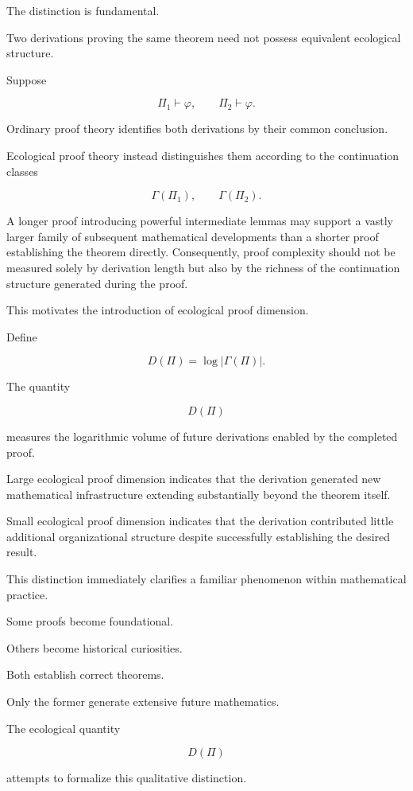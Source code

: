 \documentclass[12pt,oneside]{article}
\theoremstyle{remark}
\begin{document}
The distinction is fundamental.

Two derivations proving the same theorem need not possess equivalent ecological
structure.

Suppose

\[
\Pi_1
\vdash
\varphi,
\qquad
\Pi_2
\vdash
\varphi.
\]

Ordinary proof theory identifies both derivations by their common conclusion.

Ecological proof theory instead distinguishes them according to the
continuation classes

\[
\Gamma(\Pi_1),
\qquad
\Gamma(\Pi_2).
\]

A longer proof introducing powerful intermediate lemmas may support a vastly
larger family of subsequent mathematical developments than a shorter proof
establishing the theorem directly. Consequently, proof complexity should not be
measured solely by derivation length but also by the richness of the
continuation structure generated during the proof.

This motivates the introduction of ecological proof dimension.

Define

\[
D(\Pi)
=
\log
|\Gamma(\Pi)|.
\]

The quantity

\[
D(\Pi)
\]

measures the logarithmic volume of future derivations enabled by the completed
proof.

Large ecological proof dimension indicates that the derivation generated new
mathematical infrastructure extending substantially beyond the theorem itself.

Small ecological proof dimension indicates that the derivation contributed
little additional organizational structure despite successfully establishing the
desired result.

This distinction immediately clarifies a familiar phenomenon within
mathematical practice.

Some proofs become foundational.

Others become historical curiosities.

Both establish correct theorems.

Only the former generate extensive future mathematics.

The ecological quantity

\[
D(\Pi)
\]

attempts to formalize this qualitative distinction.
\end{document}
